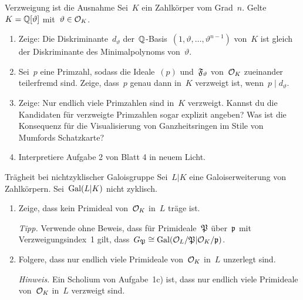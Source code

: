 \documentclass{uebblatt}
\begin{document}

\begin{aufgabe}{Verzweigung ist die Ausnahme}
Sei~$K$ ein Zahlkörper vom Grad~$n$. Gelte~$K = \mathbb{Q}[\vartheta]$ mit~$\vartheta
\in \mathcal{O}_K$.
\begin{enumerate}
\item Zeige: Die Diskriminante~$d_\vartheta$
der~$\mathbb{Q}$-Basis~$(1,\vartheta,\ldots,\vartheta^{n-1})$ von~$K$ ist gleich der
Diskriminante des Minimalpolynoms von~$\vartheta$.
\item Sei~$p$ eine Primzahl, sodass die Ideale~$(p)$ und~$\mathfrak{F}_\vartheta$
von~$\mathcal{O}_K$ zueinander teilerfremd sind. Zeige, dass~$p$ genau dann in~$K$
verzweigt ist, wenn~$p \mid d_\vartheta$.
\item Zeige: Nur endlich viele Primzahlen sind in~$K$ verzweigt. Kannst du die
Kandidaten für verzweigte Primzahlen sogar explizit angeben? Was ist die
Konsequenz für die Visualisierung von Ganzheitsringen im Stile von Mumfords
Schatzkarte?
\item Interpretiere Aufgabe 2 von Blatt 4 in neuem Licht.
\end{enumerate}
\end{aufgabe}

\begin{aufgabe}{Trägheit bei nichtzyklischer Galoisgruppe}
Sei~$L|K$ eine Galoiserweiterung von Zahlkörpern. Sei~$\mathrm{Gal}(L|K)$ nicht zyklisch.
\begin{enumerate}
\item Zeige, dass kein Primideal von~$\mathcal{O}_K$ in~$L$ träge ist.

{\tiny\emph{Tipp.} Verwende ohne Beweis, dass für Primideale~$\mathfrak{P}$ über~$\mathfrak{p}$
mit Verzweigungsindex~1 gilt, dass~$G_{\mathfrak{P}} \cong
\mathrm{Gal}(\mathcal{O}_L/\mathfrak{P}|\mathcal{O}_K/\mathfrak{p})$.\par}
\item Folgere, dass nur endlich viele Primideale von~$\mathcal{O}_K$ in~$L$ unzerlegt sind.

{\tiny\emph{Hinweis.} Ein Scholium von Aufgabe~1c) ist, dass nur endlich viele
Primideale von~$\mathcal{O}_K$ in~$L$ verzweigt sind.\par}
\end{enumerate}
\end{aufgabe}
\end{document}
